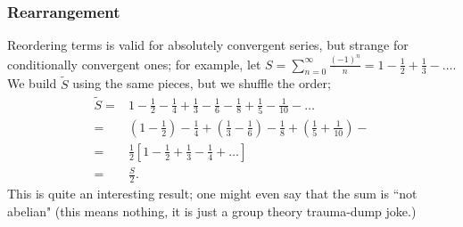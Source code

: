 \subsubsection{Rearrangement}
Reordering terms is valid for absolutely convergent series, but strange for conditionally convergent ones; for example, let \(S=\displaystyle\sum_{n=0}^{\infty}\displaystyle\frac{(-1)^n}{n}=1-\frac{1}{2}+\frac{1}{3}-\dots\). We build \(\tilde{S}\) using the same pieces, but we shuffle the order;
\begin{align*}
	\tilde{S}=&1-\frac{1}{2}-\frac{1}{4}+\frac{1}{3}-\frac{1}{6}-\frac{1}{8}+\frac{1}{5}-\frac{1}{10}-\dots\\
	=&\left(1-\frac{1}{2}\right)-\frac{1}{4}+\left(\frac{1}{3}-\frac{1}{6}\right)-\frac{1}{8}+\left(\frac{1}{5}+\frac{1}{10}\right)-\\
	=&\frac{1}{2}\left[1-\frac{1}{2}+\frac{1}{3}-\frac{1}{4}+\dots\right]\\
	=&\frac{S}{2}.
\end{align*}
This is quite an interesting result; one might even say that the sum is ``not abelian" (this means nothing, it is just a group theory trauma-dump joke.)